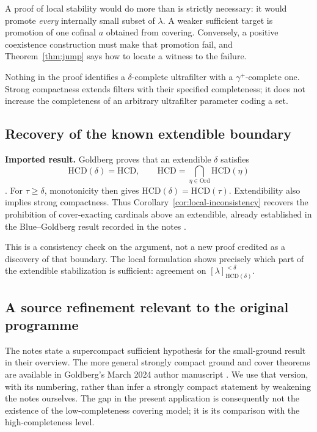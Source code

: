 \documentclass[11pt,letterpaper]{article}
\theoremstyle{definition}
\newcommand{\Ord}{\mathrm{Ord}}
\newcommand{\HCD}{\mathrm{HCD}}
\newcommand{\powersmall}[3]{[#1]^{<#2}_{#3}}
\newcommand{\blackbox}{\textbf{Imported result.} }
\begin{document}
A proof of local stability would do more than is strictly necessary: it would promote \emph{every} internally small subset of $\lambda$. A weaker sufficient target is promotion of one cofinal $a$ obtained from covering. Conversely, a positive coexistence construction must make that promotion fail, and Theorem~\ref{thm:jump} says how to locate a witness to the failure.

Nothing in the proof identifies a $\delta$-complete ultrafilter with a $\gamma^+$-complete one. Strong compactness extends filters with their specified completeness; it does not increase the completeness of an arbitrary ultrafilter parameter coding a set.

\subsection{Recovery of the known extendible boundary}

\blackbox Goldberg proves that an extendible $\delta$ satisfies
\[
 \HCD(\delta)=\HCD,
 \qquad \HCD=\bigcap_{\eta\in\Ord}\HCD(\eta)
\]
\cite[Theorem 4.15]{unique}. For $\tau\geq\delta$, monotonicity then gives $\HCD(\delta)=\HCD(\tau)$. Extendibility also implies strong compactness. Thus Corollary~\ref{cor:local-inconsistency} recovers the prohibition of cover-exacting cardinals above an extendible, already established in the Blue--Goldberg result recorded in the notes \cite[Theorem 3.6]{cover}.

This is a consistency check on the argument, not a new proof credited as a discovery of that boundary. The local formulation shows precisely which part of the extendible stabilization is sufficient: agreement on $\powersmall{\lambda}{\delta}{\HCD(\delta)}$.

\subsection{A source refinement relevant to the original programme}

The notes state a supercompact sufficient hypothesis for the small-ground result in their overview. The more general strongly compact ground and cover theorems are available in Goldberg's March 2024 author manuscript \cite[Theorems 4.10, 4.14 and Proposition 4.11]{unique}. We use that version, with its numbering, rather than infer a strongly compact statement by weakening the notes ourselves. The gap in the present application is consequently not the existence of the low-completeness covering model; it is its comparison with the high-completeness level.
\end{document}
